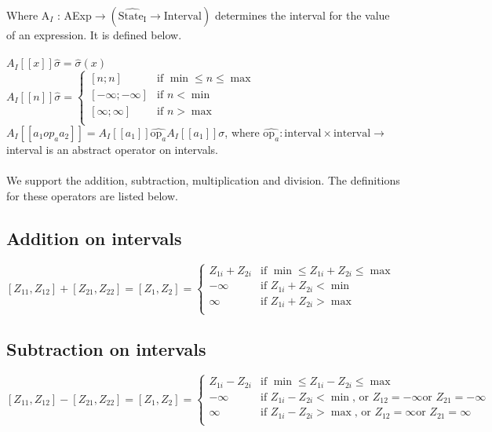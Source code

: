 Where A$_I$ : AExp$ \rightarrow (\widehat{\text{State}_{\text{I}}} \rightarrow \text{Interval})$ determines the interval for the value of an expression. It is defined below.\\\\

$A_I[\![x]\!]\widehat{\sigma} = \widehat{\sigma}(x)$ \\
$A_I[\![n]\!]\widehat{\sigma} = 
     \begin{cases} 
        [n;n] & \text{if } \min \leq n \leq \max \\
        [-\infty;-\infty] & \text{if } n < \min\\
        [\infty;\infty] & \text{if } n > \max\\
     \end{cases}$\\

$A_I[\![a_1 op_a a_2 ]\!] = A_I[\![a_1]\!] \widehat{\text{op}_a} A_I[\![a_1]\!]\sigma $, where $  \widehat{\text{op}_a} : \text{interval} \times \text{interval} \rightarrow $  interval is an abstract operator on intervals.\\
\\
We support the addition, subtraction, multiplication and division. The definitions for these operators are listed below.

\subsection{Addition on intervals}
$[Z_{11},Z_{12}] + [Z_{21},Z_{22}] = [Z_{1},Z_{2}] =
     \begin{cases} 
        Z_{1i} + Z_{2i} & \text{if } \min \leq Z_{1i} + Z_{2i} \leq \max \\
        -\infty         & \text{if } Z_{1i} + Z_{2i} < \min \\
        \infty          & \text{if } Z_{1i} + Z_{2i} > \max\\
     \end{cases}
$

\subsection{Subtraction on intervals}
$[Z_{11},Z_{12}] - [Z_{21},Z_{22}] = [Z_{1},Z_{2}] =
     \begin{cases} 
        Z_{1i} - Z_{2i} & \text{if } \min \leq Z_{1i} - Z_{2i} \leq \max \\
        -\infty         & \text{if } Z_{1i} - Z_{2i} < \min \text{, or } Z_12 = -\infty  \text{or } Z_21 = -\infty\\
        \infty          & \text{if } Z_{1i} - Z_{2i} > \max \text{, or } Z_12 = \infty  \text{or } Z_21 = \infty\\
     \end{cases}
$

